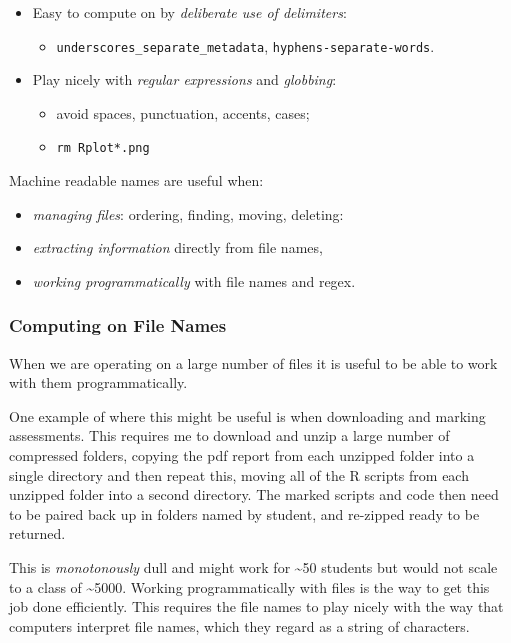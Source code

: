 \documentclass[
  letterpaper,
  DIV=11,
  numbers=noendperiod]{scrreprt}
\providecommand{\tightlist}{%
  \setlength{\itemsep}{0pt}\setlength{\parskip}{0pt}}\usepackage{longtable,booktabs,array}
\begin{document}
\begin{itemize}
\tightlist
\item
  Easy to compute on by \emph{deliberate use of delimiters}:

  \begin{itemize}
  \tightlist
  \item
    \texttt{underscores\_separate\_metadata},
    \texttt{hyphens-separate-words}.
  \end{itemize}
\item
  Play nicely with \emph{regular expressions} and \emph{globbing}:

  \begin{itemize}
  \tightlist
  \item
    avoid spaces, punctuation, accents, cases;
  \item
    \texttt{rm\ Rplot*.png}
  \end{itemize}
\end{itemize}

Machine readable names are useful when:

\begin{itemize}
\item
  \emph{managing files}: ordering, finding, moving, deleting:
\item
  \emph{extracting information} directly from file names,
\item
  \emph{working programmatically} with file names and regex.
\end{itemize}

\subsubsection{Computing on File Names}\label{computing-on-file-names}

When we are operating on a large number of files it is useful to be able
to work with them programmatically.

One example of where this might be useful is when downloading and
marking assessments. This requires me to download and unzip a large
number of compressed folders, copying the pdf report from each unzipped
folder into a single directory and then repeat this, moving all of the R
scripts from each unzipped folder into a second directory. The marked
scripts and code then need to be paired back up in folders named by
student, and re-zipped ready to be returned.

This is \emph{monotonously} dull and might work for \textasciitilde50
students but would not scale to a class of \textasciitilde5000. Working
programmatically with files is the way to get this job done efficiently.
This requires the file names to play nicely with the way that computers
interpret file names, which they regard as a string of characters.
\end{document}
